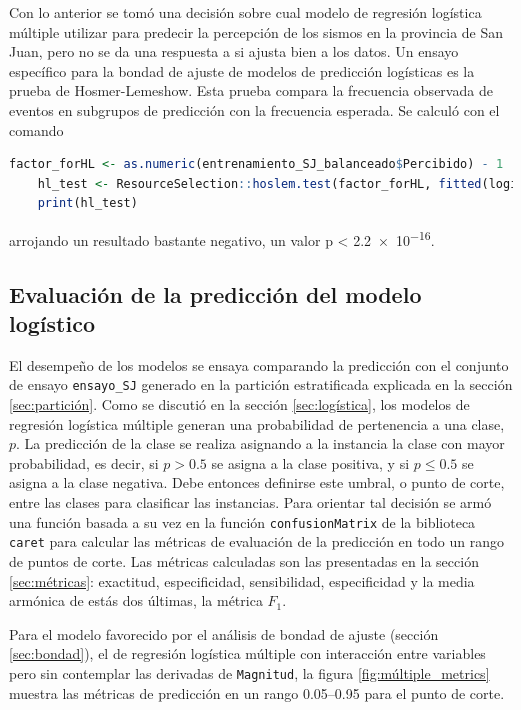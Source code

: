 \documentclass[a4paper]{report}
\begin{document}
Con lo anterior se tomó una decisión sobre cual modelo de regresión logística múltiple utilizar para predecir la percepción de los sismos en la provincia de San Juan, pero no se da una respuesta a si ajusta bien a los datos.
Un ensayo específico para la bondad de ajuste de modelos de predicción logísticas es la prueba de Hosmer-Lemeshow. 
Esta prueba compara la frecuencia observada de eventos en subgrupos de predicción con la frecuencia esperada.
Se calculó con el comando
\begin{lstlisting}[language=R, breaklines=true]
	factor_forHL <- as.numeric(entrenamiento_SJ_balanceado$Percibido) - 1
	hl_test <- ResourceSelection::hoslem.test(factor_forHL, fitted(logit_pairwise_limpio))
	print(hl_test)
\end{lstlisting}
arrojando un resultado bastante negativo, un valor p < \num{2.2e-16}.



\subsection{Evaluación de la predicción del modelo logístico}
El desempeño de los modelos se ensaya comparando la predicción con el conjunto de ensayo \verb'ensayo_SJ' generado en la partición estratificada explicada en la sección \ref{sec:partición}.
Como se discutió en la sección \ref{sec:logística}, los modelos de regresión logística múltiple generan una probabilidad de pertenencia a una clase, \(p\).
La predicción de la clase se realiza asignando a la instancia la clase con mayor probabilidad, es decir, si \(p > 0.5\) se asigna a la clase positiva, y si \(p \leq 0.5\) se asigna a la clase negativa. 
Debe entonces definirse este umbral, o punto de corte, entre las clases para clasificar las instancias.
Para orientar tal decisión se armó una función basada a su vez en la función \lstinline[language=R]{confusionMatrix} de la biblioteca \lstinline[language=R]{caret} para calcular las métricas de evaluación de la predicción en todo un rango de puntos de corte.
Las métricas calculadas son las presentadas en la sección \ref{sec:métricas}: exactitud, especificidad, sensibilidad, especificidad y la media armónica de estás dos últimas, la métrica \(F_1\).

Para el modelo favorecido por el análisis de bondad de ajuste (sección \ref{sec:bondad}), el de regresión logística múltiple con interacción entre variables pero sin contemplar las derivadas de \verb'Magnitud', la figura \ref{fig:múltiple_metrics} muestra las métricas de predicción en un rango \SIrange{0.05}{0.95}{} para el punto de corte.
\end{document}
